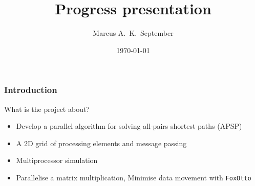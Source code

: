 \documentclass{beamer}
\title{Progress presentation}
\subtitle{\dissertationtitle}
\author{Marcus A.\ K.\ September}
\date{\today}
\begin{document}
\begin{frame}
    \titlepage
\end{frame}

\begin{frame}
    \frametitle{Introduction}
    \begin{block}{What is the project about?}
        \begin{itemize} \item Develop a parallel algorithm for solving
            all-pairs shortest paths (APSP)
            \item A 2D grid of processing elements and message passing
            \item Multiprocessor simulation
            \item Parallelise a matrix multiplication, Minimise data movement with \texttt{FoxOtto}
        \end{itemize}
    \end{block}
\end{frame}
\end{document}
